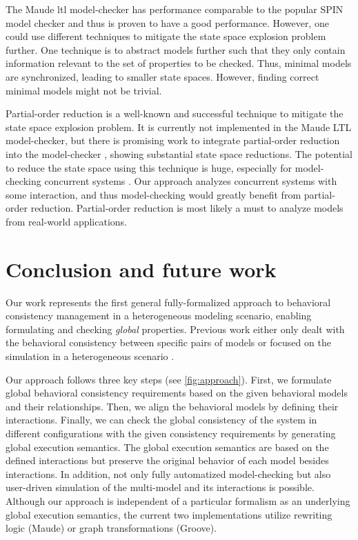 \documentclass{jot}
\begin{document}
The Maude \gls*{ltl} model-checker has performance comparable to the popular SPIN model checker \cite{ekerMaudeLTLModel2004} and thus is proven to have a good performance.
However, one could use different techniques to mitigate the state space explosion problem further.
One technique is to abstract models further such that they only contain information relevant to the set of properties to be checked.
Thus, minimal models are synchronized, leading to smaller state spaces.
However, finding correct minimal models might not be trivial.

Partial-order reduction is a well-known and successful technique to mitigate the state space explosion problem.
It is currently not implemented in the Maude LTL model-checker, but there is promising work to integrate partial-order reduction into the model-checker \cite{farzanPartialOrderReduction2007}, showing substantial state space reductions.
The potential to reduce the state space using this technique is huge, especially for model-checking concurrent systems \cite{clarkeHandbookModelChecking2018}.
Our approach analyzes concurrent systems with some interaction, and thus model-checking would greatly benefit from partial-order reduction.
Partial-order reduction is most likely a must to analyze models from real-world applications.

\section{Conclusion and future work} \label{sec:conclusion_and_future_work}
Our work represents the first general fully-formalized approach to behavioral consistency management in a heterogeneous modeling scenario, enabling formulating and checking \emph{global} properties.
Previous work either only dealt with the behavioral consistency between specific pairs of models \cite{yaoConsistencyCheckingUML2006, kusterExplicitBehavioralConsistency2003} or focused on the simulation in a heterogeneous scenario \cite{deantoniModelingBehavioralSemantics2016, varalarsenBCoolBehavioralCoordination2016, ekerTamingHeterogeneityPtolemy2003, leeDisciplinedHeterogeneousModeling2010}.

Our approach follows three key steps (see \autoref{fig:approach}).
First, we formulate global behavioral consistency requirements based on the given behavioral models and their relationships. 
Then, we align the behavioral models by defining their interactions.
Finally, we can check the global consistency of the system in different configurations with the given consistency requirements by generating global execution semantics.
The global execution semantics are based on the defined interactions but preserve the original behavior of each model besides interactions.
In addition, not only fully automatized model-checking but also user-driven simulation of the multi-model and its interactions is possible.
Although our approach is independent of a particular formalism as an underlying global execution semantics, the current two implementations utilize rewriting logic (Maude) or graph transformations (Groove).
\end{document}
